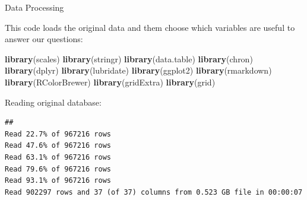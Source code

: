 \documentclass[]{article}
\newenvironment{Shaded}{\begin{snugshade}}{\end{snugshade}}
\newcommand{\KeywordTok}[1]{\textcolor[rgb]{0.13,0.29,0.53}{\textbf{{#1}}}}
\newcommand{\DataTypeTok}[1]{\textcolor[rgb]{0.13,0.29,0.53}{{#1}}}
\newcommand{\CharTok}[1]{\textcolor[rgb]{0.31,0.60,0.02}{{#1}}}
\newcommand{\StringTok}[1]{\textcolor[rgb]{0.31,0.60,0.02}{{#1}}}
\newcommand{\CommentTok}[1]{\textcolor[rgb]{0.56,0.35,0.01}{\textit{{#1}}}}
\newcommand{\NormalTok}[1]{{#1}}
\begin{document}
Data Processing

This code loads the original data and them choose which variables are
useful to answer our questions:

\begin{Shaded}
\begin{Highlighting}[]
\KeywordTok{library}\NormalTok{(scales)}
\KeywordTok{library}\NormalTok{(stringr)}
\KeywordTok{library}\NormalTok{(data.table)}
\KeywordTok{library}\NormalTok{(chron)}
\KeywordTok{library}\NormalTok{(dplyr)}
\KeywordTok{library}\NormalTok{(lubridate)}
\KeywordTok{library}\NormalTok{(ggplot2)}
\KeywordTok{library}\NormalTok{(rmarkdown)}
\KeywordTok{library}\NormalTok{(RColorBrewer)}
\KeywordTok{library}\NormalTok{(gridExtra)}
\KeywordTok{library}\NormalTok{(grid)}
\end{Highlighting}
\end{Shaded}

Reading original database:

\begin{Shaded}
\end{Shaded}

\begin{verbatim}
## 
Read 22.7% of 967216 rows
Read 47.6% of 967216 rows
Read 63.1% of 967216 rows
Read 79.6% of 967216 rows
Read 93.1% of 967216 rows
Read 902297 rows and 37 (of 37) columns from 0.523 GB file in 00:00:07
\end{verbatim}
\end{document}
